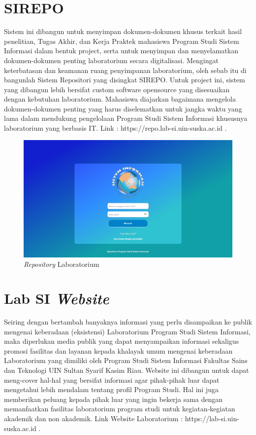 \section{SIREPO}
Sistem ini dibangun untuk menyimpan dokumen-dokumen khusus terkait hasil penelitian, Tugas Akhir, dan Kerja Praktek mahasiswa Program Studi Sistem Informasi dalam bentuk project, serta untuk menyimpan dan menyelamatkan dokumen-dokumen penting laboratorium secara digitalisasi. Mengingat keterbatasan dan keamanan ruang penyimpanan laboratorium, oleh sebab itu di bangunlah Sistem Repositori yang disingkat SIREPO. Untuk project ini, sistem yang dibangun lebih bersifat custom software opensource yang disesuaikan dengan kebutuhan laboratorium. Mahasiswa diajarkan bagaimana mengelola dokumen-dokumen penting yang harus diselematkan untuk jangka waktu yang lama dalam mendukung pengelolaan Program Studi Sistem Informasi khususnya laboratorium yang berbasis IT. Link : https://repo.lab-si.uin-suska.ac.id \cite{web-prodi}.

\begin{figure}
	\centering
	\includegraphics[width=0.82\linewidth]{konten//gambar/sirepo.png}
	\caption{\textit{Repository} Laboratorium \protect\cite{web-prodi}}
	\label{fig:enter-label}
\end{figure}

\section{Lab SI \textit{Website}}
Seiring dengan bertambah banyaknya informasi yang perlu disampaikan ke publik mengenai keberadaan (eksistensi) Laboratorium Program Studi Sistem Informasi, maka diperlukan media publik yang dapat menyampaikan informasi sekaligus promosi fasilitas dan layanan kepada khalayak umum mengenai keberadaan Laboratorium yang dimiliki oleh Program Studi Sistem Informasi Fakultas Sains dan Teknologi UIN Sultan Syarif Kasim Riau. Website ini dibangun untuk dapat meng-cover hal-hal yang bersifat informasi agar pihak-pihak luar dapat mengetahui lebih mendalam tentang profil Program Studi. Hal ini juga memberikan peluang kepada pihak luar yang ingin bekerja sama dengan memanfaatkan fasilitas laboratorium program studi untuk kegiatan-kegiatan akademik dan non akademik.  Link Website Laboratorium : https://lab-si.uin-suska.ac.id \cite{web-prodi}.

